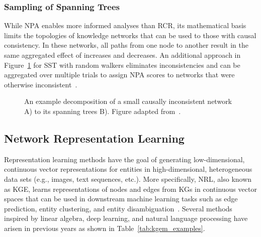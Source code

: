 \subsubsection{Sampling of Spanning Trees}

While \ac{NPA} enables more informed analyses than \ac{RCR}, its mathematical basis limits the topologies of knowledge networks that can be used to those with causal consistency.
In these networks, all paths from one node to another result in the same aggregated effect of increases and decreases.
An additional approach in Figure~\ref{fig:sst_schematic} for \ac{SST} with random walkers eliminates inconsistencies and can be aggregated over multiple trials to assign \ac{NPA} scores to networks that were otherwise inconsistent~\cite{Vasilyev2014}.

\begin{figure}
\captionsetup{format=plain}
\caption[Decomposition of Spanning Trees]{An example decomposition of a small causally inconsistent network A) to its spanning trees B). Figure adapted from~\cite{Vasilyev2014}.}
\label{fig:sst_schematic}
\end{figure}

\subsection{Network Representation Learning}
\label{subsec:nrl}

Representation learning methods have the goal of generating low-dimensional, continuous vector representations for entities in high-dimensional, heterogeneous data sets (e.g., images, text sequences, etc.).
More specifically, \ac{NRL}, also known as \ac{KGE}, learns representations of nodes and edges from \acp{KG} in continuous vector spaces that can be used in downstream machine learning tasks such as edge prediction, entity clustering, and entity disambiguation~\cite{Wang2017}.
Several methods inspired by linear algebra, deep learning, and natural language processing have arisen in previous years as shown in Table~\ref{tab:kgem_examples}.

